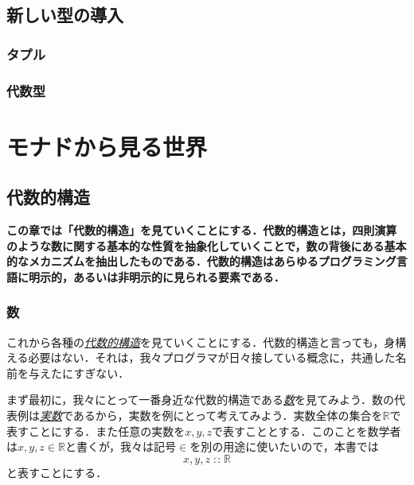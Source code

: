 \documentclass[a5paper,draft]{jsbook}
\newenvironment{leader}{\begingroup\bf}{\endgroup}
\newcommand{\keyword}[1]{{\underline{\emph{#1}}}}
\newcommand{\mathSpecialSet}[1]{\mathbb{#1}} %
\newcommand{\mathBinaryOperator}[1]{\operatorname{#1}}
\newcommand{\mathIn}{\mathBinaryOperator{:\!:}}
\begin{document}
\chapter{新しい型の導入}

\section{タプル}

\section{代数型}



\part{モナドから見る世界}

\chapter{代数的構造}

\begin{leader}
この章では「代数的構造」を見ていくことにする．代数的構造とは，四則演算のような数に関する基本的な性質を抽象化していくことで，数の背後にある基本的なメカニズムを抽出したものである．代数的構造はあらゆるプログラミング言語に明示的，あるいは非明示的に見られる要素である．
\end{leader}

\section{数}

これから各種の\keyword{代数的構造}を見ていくことにする．代数的構造と言っても，身構える必要はない．それは，我々プログラマが日々接している概念に，共通した名前を与えたにすぎない．

まず最初に，我々にとって一番身近な代数的構造である\keyword{数}を見てみよう．数の代表例は\keyword{実数}であるから，実数を例にとって考えてみよう．実数全体の集合を$\mathSpecialSet{R}$で表すことにする．また任意の実数を$x,y,z$で表すこととする．このことを数学者は$x,y,z\in\mathSpecialSet{R}$と書くが，我々は記号$\in$を別の用途に使いたいので，本書では
\begin{equation}
x,y,z\mathIn\mathSpecialSet{R}
\end{equation}
と表すことにする．
\end{document}
